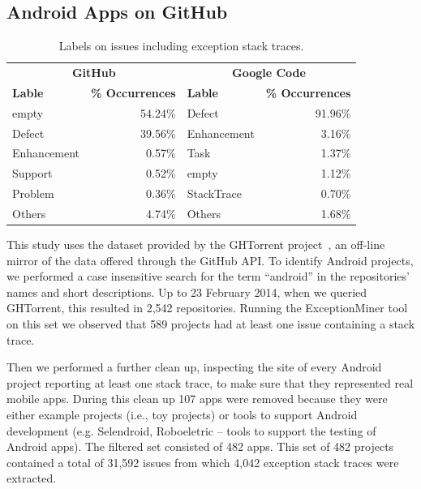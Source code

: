 
\subsection{Android Apps on GitHub}
\label{sec:git}

\begin{table}
  \scriptsize
  \centering
  \begin{tabular}{lr|lr}
    \hline
     \multicolumn{2}{c}{\bfseries{GitHub}} &  \multicolumn{2}{c}{\bfseries{Google Code}} \\
      \bfseries{Lable} &  \bfseries{\% Occurrences} &  \bfseries{Lable} &  \bfseries{\% Occurrences} \\
    \hline
empty &	54.24\% & Defect &	91.96\% \\
Defect &	39.56\%  & Enhancement  &	3.16\% \\
Enhancement &	0.57\% & Task	& 1.37\% \\
Support &	0.52\% & empty &	1.12\% \\
Problem &	0.36\% & StackTrace &	0.70\% \\
Others &	4.74\% &  Others &	1.68\% \\
  \hline
  \end{tabular}
  \caption{Labels on issues including exception stack traces.}
  \label{tab:lables}
\end{table}


This study uses the dataset provided by the GHTorrent project~\cite{Gousi13},
an off-line mirror of the data  offered through the GitHub API.
To identify Android projects, we performed a case insensitive search for the
term ``android'' in the repositories' names and short descriptions.
Up to 23 February 2014,  when we queried GHTorrent, this resulted in 2,542 repositories. Running the ExceptionMiner tool
 on this set we observed that 589 projects had at least one issue containing a stack trace.

Then we performed a further clean up, inspecting the site of every Android project
reporting at least one stack trace, to make sure that they represented real
mobile apps. During this clean up 107 apps were removed because they were either
example projects (i.e., toy projects) or tools to support Android development
(e.g. Selendroid, Roboeletric -- tools to support the testing of Android apps).
The filtered set consisted of 482 apps. This set of 482 projects contained a total of 31,592 issues from which 4,042 exception stack traces
were extracted.


